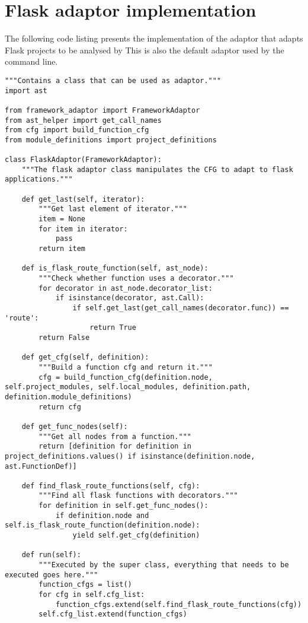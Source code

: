 \chapter{Flask adaptor implementation}\label{appendix:flask_adaptor}
The following code listing presents the implementation of the adaptor that adapts Flask projects to be analysed by \pyt{}
This is also the default adaptor used by the \pyt{} command line.

\begin{lstlisting}[style=python, caption={Implementation of the Flask adaptor}, label={flask_adaptor_implementation}]
"""Contains a class that can be used as adaptor."""
import ast

from framework_adaptor import FrameworkAdaptor
from ast_helper import get_call_names
from cfg import build_function_cfg
from module_definitions import project_definitions

class FlaskAdaptor(FrameworkAdaptor):
    """The flask adaptor class manipulates the CFG to adapt to flask applications."""

    def get_last(self, iterator):
        """Get last element of iterator."""
        item = None
        for item in iterator:
            pass
        return item

    def is_flask_route_function(self, ast_node):
        """Check whether function uses a decorator."""
        for decorator in ast_node.decorator_list:
            if isinstance(decorator, ast.Call):
                if self.get_last(get_call_names(decorator.func)) == 'route':
                    return True
        return False

    def get_cfg(self, definition):
        """Build a function cfg and return it."""
        cfg = build_function_cfg(definition.node, self.project_modules, self.local_modules, definition.path, definition.module_definitions)
        return cfg

    def get_func_nodes(self):
        """Get all nodes from a function."""
        return [definition for definition in project_definitions.values() if isinstance(definition.node, ast.FunctionDef)]

    def find_flask_route_functions(self, cfg):
        """Find all flask functions with decorators."""
        for definition in self.get_func_nodes():
            if definition.node and self.is_flask_route_function(definition.node):
                yield self.get_cfg(definition)

    def run(self):
        """Executed by the super class, everything that needs to be executed goes here."""
        function_cfgs = list()
        for cfg in self.cfg_list:
            function_cfgs.extend(self.find_flask_route_functions(cfg))
        self.cfg_list.extend(function_cfgs)
\end{lstlisting}
